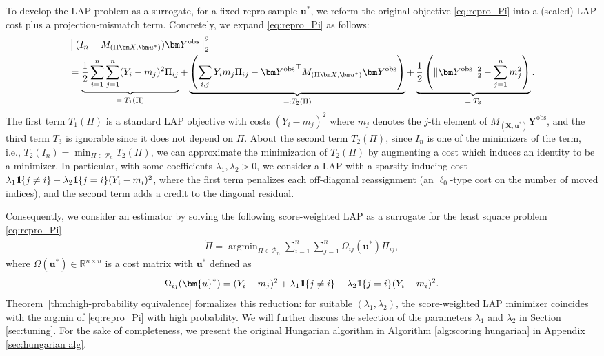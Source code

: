\documentclass[11pt, reqno]{amsart}
\newcommand{\R}{\mathbb{R}}
\renewcommand{\tilde}{\widetilde}
\newcommand{\mP}{\mathcal{P}}
\newcommand{\1}{\mbox{1}\hspace{-0.25em}\mbox{l}}
\newcommand{\rc}{\color{red}}
\newcommand{\obs}{\mathrm{obs}}
\DeclareMathOperator*{\argmin}{argmin}
\theoremstyle{definition}\newtheorem{problem}{Problem}[section]
\theoremstyle{definition}\newtheorem{definition}[problem]{Definition}
\theoremstyle{remark}\newtheorem{assumption}{Assumption}
\theoremstyle{remark}\newtheorem{remark}[problem]{Remark}
\theoremstyle{definition}\newtheorem{example}[problem]{Example}
\theoremstyle{plain}\newtheorem{theorem}[problem]{Theorem}
\theoremstyle{plain}\newtheorem{question}[problem]{Question}
\theoremstyle{plain}\newtheorem{lemma}[problem]{Lemma}
\theoremstyle{plain}\newtheorem{proposition}[problem]{Proposition}
\theoremstyle{plain}\newtheorem{corollary}[problem]{Corollary}
\theoremstyle{plain}\newtheorem{conjecture}[problem]{Conjecture}
\begin{document}
To develop the LAP problem as a surrogate, for a fixed repro sample $\bm u^*$, we reform the original objective \eqref{eq:repro_Pi} into a (scaled) LAP cost plus a projection-mismatch term. Concretely, we expand \eqref{eq:repro_Pi} as follows: \begin{align} 
&\left\|(I_n-M_{(\Pi\bm X,\bm u^*)})\bm Y^{\obs}\right\|_2^2 \label{eq:lap-core-decomp}\\
&=
\underbrace{\frac{1}{2}\sum_{i=1}^n\sum_{j=1}^n (Y_i-m_j)^2\Pi_{ij}}_{=:T_1(\Pi)}
+ \underbrace{\left(\sum_{i,j} Y_i m_j\Pi_{ij}-{\bm Y^{\obs}}^\top M_{(\Pi\bm X,\bm u^*)}\bm Y^{\obs}\right)}_{=: T_2(\Pi)}
+ \underbrace{\frac12\left(\|\bm Y^{\obs}\|_2^2-\sum_{j=1}^n m_j^2\right)}_{=:T_3}. \notag 
\end{align}
The first term $T_1(\Pi)$ is a standard LAP objective with costs $(Y_i-m_j)^2$ where $m_j$ denotes the $j$-th element of $M_{(\bm{X}, \bm{u}^*)}\bm{Y}^{\obs}$, and the third term $T_3$ is ignorable since it does not depend on $\Pi$.
About the second term $T_2(\Pi)$, since $I_n$ is one of the minimizers of the term, i.e., $T_2(I_n) = \min_{\Pi \in \mP_n} T_2(\Pi)$, we can approximate the minimization of $T_2(\Pi)$ by augmenting a cost which induces an identity to be a minimizer. 
In particular, with some coefficients $\lambda_1, \lambda_2 > 0$, we consider a LAP with a sparsity-inducing cost $\lambda_1\1\{j\neq i\} -\lambda_2\1\{j=i\}(Y_i-m_i)^2$, where the first term penalizes each off-diagonal reassignment (an $\ell_0$-type cost on the number of moved indices), and the second term adds a credit to the diagonal residual. %


Consequently, we consider an estimator by solving the following score-weighted LAP as a surrogate for the least square problem \eqref{eq:repro_Pi}
\begin{align}  \label{def:tilde_Pi}
  \tilde{\Pi}
  = \argmin_{\Pi \in \mP_n}
    \sum_{i=1}^n \sum_{j=1}^n \Omega_{ij}(\bm{u}^*)\Pi_{ij},
\end{align}
where $\Omega(\bm{u}^*) \in \R^{n \times n}$ is a cost matrix with $\bm{u}^*$ defined as
\begin{align} \label{eq:Omega_ustar}
  \Omega_{ij}(\bm{u}^*)
  =  (Y_i - m_j)^2 + \lambda_1\1\{j\neq i\}
     -\lambda_2 \1\{j=i\}(Y_i - m_i)^2.
\end{align}
Theorem~\ref{thm:high-probability equivalence} formalizes this reduction: for suitable $(\lambda_1,\lambda_2)$, the score-weighted LAP minimizer coincides with the argmin of \eqref{eq:repro_Pi} with high probability.
We will further discuss the selection of the parameters $\lambda_1$ and $\lambda_2$ in Section \ref{sec:tuning}.
For the sake of completeness, we present the original Hungarian algorithm in Algorithm \ref{alg:scoring hungarian} in Appendix \ref{sec:hungarian alg}.
\end{document}
